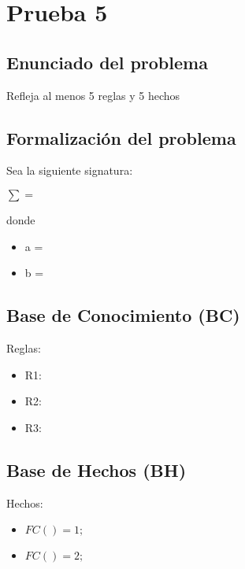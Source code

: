\section{Prueba 5}
\subsection{Enunciado del problema}
Refleja al menos 5 reglas y 5 hechos

\subsection{Formalización del problema}
\par Sea la siguiente signatura:
\par $\sum={}$
\par donde
\begin{itemize}
    \item a =
    \item b =
\end{itemize}

\subsection{Base de Conocimiento (BC)}
Reglas:
\begin{itemize}
    \item R1:
    \item R2:
    \item R3:
\end{itemize}

\subsection{Base de Hechos (BH)}
Hechos:
\begin{itemize}
    \item $FC()= 1;$
    \item $FC()=2;$
\end{itemize}
\newpage
